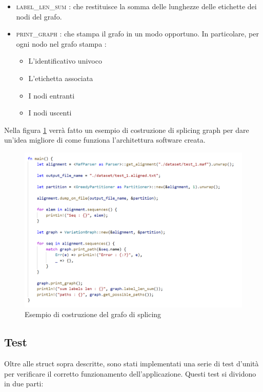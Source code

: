 \begin{itemize}
    \item \textsc{label\_len\_sum} : che restituisce la somma delle lunghezze delle etichette dei nodi del grafo.
    
    \item \textsc{print\_graph} : che stampa il grafo in un modo opportuno. In particolare, per ogni nodo nel grafo stampa : 
    
    \begin{itemize}
        \item L'identificativo univoco
        \item L'etichetta associata
        \item I nodi entranti
        \item I nodi uscenti
    \end{itemize}
\end{itemize}

\newpage

Nella figura \ref{fig:construction_example} verrà fatto un esempio di costruzione di splicing graph per dare un'idea migliore di come funziona l'architettura software creata.

\begin{figure}[ht]
    \centering
    \includegraphics[scale=0.6]{images/main example.PNG}
    \caption{Esempio di costruzione del grafo di splicing}
    \label{fig:construction_example}
\end{figure}

\clearpage

\subsection{Test}
Oltre alle struct sopra descritte, sono stati implementati una serie di test d'unità per verificare il corretto funzionamento dell'applicazione.
Questi test si dividono in due parti:

